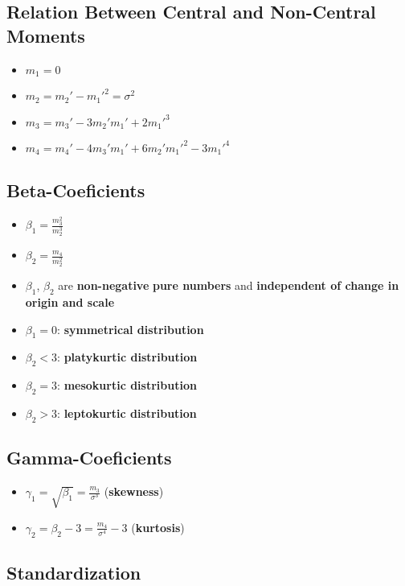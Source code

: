 \subsection*{Relation Between Central and Non-Central Moments}
\begin{itemize}
    \item $m_1 = 0$
    \item $m_2 = m_2' - m_1'^2 = \sigma^2$
    \item $m_3 = m_3' - 3m_2' m_1' + 2m_1'^3$
    \item $m_4 = m_4' - 4m_3' m_1' + 6m_2' m_1'^2 - 3m_1'^4$
\end{itemize}

\subsection*{Beta-Coeficients}
\begin{itemize}
    \item $\beta_1 = \frac{m_3^2}{m_2^3}$
    \item $\beta_2 = \frac{m_4}{m_2^2}$
    \item $\beta_1$, $\beta_2$ are \textbf{non-negative} \textbf{pure numbers} and \textbf{independent of change in origin and scale}
    \item $\beta_1 = 0$: \textbf{symmetrical distribution}
    \item $\beta_2 < 3$: \textbf{platykurtic distribution}
    \item $\beta_2 = 3$: \textbf{mesokurtic distribution}
    \item $\beta_2 > 3$: \textbf{leptokurtic distribution}
\end{itemize}

\subsection*{Gamma-Coeficients}
\begin{itemize}
    \item $\gamma_1 = \sqrt{\beta_1} = \frac{m_3}{\sigma^3}$ (\textbf{skewness})
    \item $\gamma_2 = \beta_2 - 3 = \frac{m_4}{\sigma^4} - 3$ (\textbf{kurtosis})
\end{itemize}

\subsection*{Standardization}

